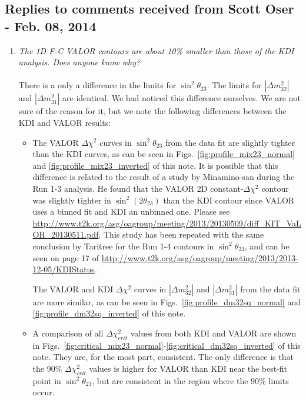 \subsection{
  Replies to comments received from Scott Oser - Feb. 08, 2014}

\begin{enumerate}

  \vspace{5 mm}
\item
  {\em
    The 1D F-C VALOR contours are about 10\% smaller than those of the KDI analysis.  Does anyone know why?
  }\\
  \\

  There is a only a difference in the limits for $\sin^{2}\theta_{23}$. The limits for $|\Delta m_{32}^{2}|$ and $|\Delta m_{31}^{2}|$ are identical.
  We had noticed this difference ourselves. We are not sure of the reason for it, but we note the following differences between the KDI and VALOR results:

  \begin{itemize}
  \item  The VALOR $\Delta \chi^2$ curves in $\sin^{2}\theta_{23}$ from the data fit are slightly tighter than the KDI curves, as can be seen in
    Figs.\ \ref{fig:profile_mix23_normal} and \ref{fig:profile_mix23_inverted} of this note.
    It is possible that this difference is related to the result of a study by Minamino-san during the Run 1-3 analysis. He found that the VALOR 2D 
    constant-$\Delta \chi^{2}$ contour was slightly tighter in $\sin^{2}(2\theta_{23})$ than the KDI contour since VALOR uses a binned fit and KDI an 
    unbinned one. Please see \url{http://www.t2k.org/asg/oagroup/meeting/2013/20130509/diff\_KIT\_VaLOR\_20130511.pdf}.
    This study has been repeated with the same conclusion by Taritree for the Run 1-4 contours in $\sin^2\theta_{23}$,
    and can be seen on page 17 of \url{http://www.t2k.org/asg/oagroup/meeting/2013/2013-12-05/KDIStatus}.

    The VALOR and KDI $\Delta \chi^2$ curves in $|\Delta m_{32}^{2}|$ and $|\Delta m_{31}^{2}|$ from the data fit are more similar, as can be seen in
    Figs.\ \ref{fig:profile_dm32sq_normal} and \ref{fig:profile_dm32sq_inverted} of this note.
    
  \item A comparison of all $\Delta \chi^{2}_{crit}$ values from both KDI and VALOR are shown in Figs.\ \ref{fig:critical_mix23_normal}-\ref{fig:critical_dm32sq_inverted}
    of this note.
    They are, for the most part, consistent.
    The only difference is that the 90\% $\Delta \chi^{2}_{crit}$ values is higher for VALOR than KDI near the best-fit point in $\sin^2\theta_{23}$,
    but are consistent in the region where the 90\% limits occur.


\end{itemize}
\end{enumerate}

